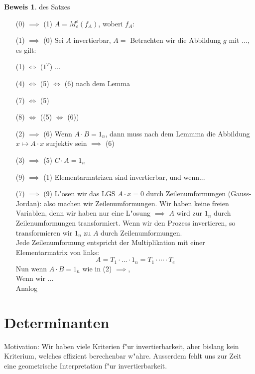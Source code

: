 \documentclass[fontsize=11pt,paper=a4,BCOR=0mm,DIV=11,automark,headsepline]{scrbook}
\theoremstyle{remark}
\theoremstyle{definition}
\theoremstyle{proof}
\newtheorem*{prof}{Beweis}
\theoremstyle{remark}
\begin{document}
\begin{prof}{des Satzes}\leavevmode
  \begin{itemize}
  \item[(0) $\implies$ (1)]  $A=M^{\varepsilon}_{\varepsilon}(f_A)$, woberi $f_A:$
  \item[(1) $\implies$ (0)] Sei $A$ invertierbar, $A=$ Betrachten wir die
    Abbildung $g$ mit ..., es gilt: 
  \item[(1) $\iff$ ($1^T$)] ...
  \item[(4) $ \iff $ (5) $ \iff $ (6)] nach dem Lemma
  \item[(7) $ \iff $ (5)]
  \item[(8) $ \iff $ ((5) $ \iff $ (6))]
  \item[(2) $ \implies $ (6)] Wenn $A\cdot B=1_n$, dann muss nach dem Lemmma die
    Abbildung $x\mapsto A\cdot x$ surjektiv sein $\implies$ (6)
  \item[(3) $ \implies $ (5)] $C\cdot A = 1_n$
  \item[(9) $ \implies $ (1)] Elementarmatrizen sind invertierbar, und wenn...
  \item[(7) $ \implies $ (9)] L"osen wir das LGS $A\cdot x = 0$ durch
    Zeilenumformungen (Gauss-Jordan): also machen wir Zeilenumformungen. Wir
    haben keine freien Variablen, denn wir haben nur eine L"osung $\implies$
    $A$ wird zur $1_n$ durch Zeilenumformungen transformiert. Wenn wir den
    Prozess invertieren, so transformieren wir $1_n$ zu $A$ durch
    Zeilenumformungen. \\
    Jede Zeilenumformung entspricht der Multiplikation mit einer
    Elementarmatrix von links: \[A=T_1 \cdot \dots \cdot 1_n = T_1 \cdot \cdots
      \cdot T_e\]
    Nun wenn $A\cdot B = 1_n$ wie in (2) $\implies$, \\
    Wenn wir ... \\
    Analog
  \end{itemize}
\end{prof}

\chapter{Determinanten}
\label{sec:det}

Motivation: Wir haben viele Kriterien f"ur invertierbarkeit, aber bislang kein
Kriterium, welches effizient berechenbar w"ahre. Ausserdem fehlt uns zur Zeit
eine geometrische Interpretation f"ur invertierbarkeit.
\end{document}
